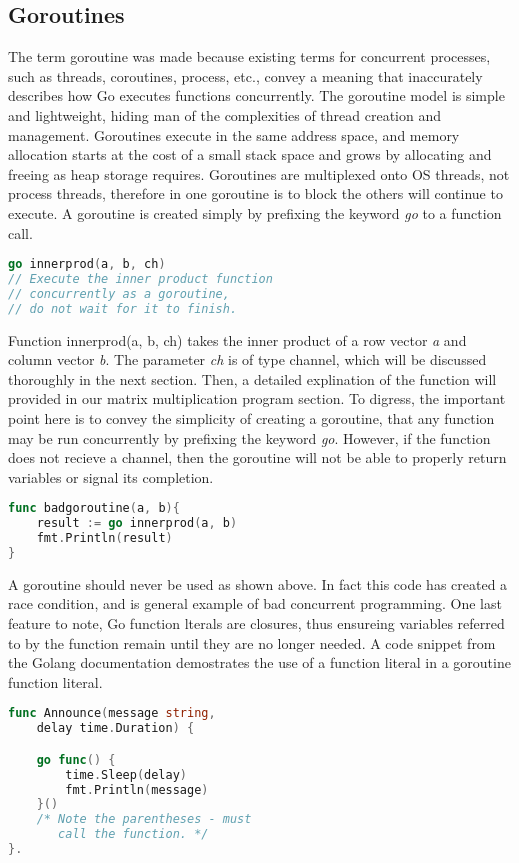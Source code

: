 \subsection{Goroutines}
	The term goroutine was made because existing terms for concurrent processes, such as threads, coroutines, process, etc., convey a meaning that inaccurately describes how Go executes functions concurrently. The goroutine model is simple and lightweight, hiding man of the complexities of thread creation and management. Goroutines execute in the same address space, and memory allocation starts at the cost of a small stack space and grows by allocating and freeing as heap storage requires. Goroutines are multiplexed onto OS threads, not process threads, therefore in one goroutine is to block the others will continue to execute.\cite{website:go-lang-documentation}
	A goroutine is created simply by prefixing the keyword \emph{go} to a function call.	
\begin{lstlisting}[language=Go]
go innerprod(a, b, ch) 
// Execute the inner product function
// concurrently as a goroutine,
// do not wait for it to finish.
\end{lstlisting}
Function innerprod(a, b, ch) takes the inner product of a row vector \emph{a} and column vector \emph{b}. The parameter \emph{ch} is of type channel, which will be discussed thoroughly in the next section. Then, a detailed explination of the function will provided in our matrix multiplication program section. To digress, the important point here is to convey the simplicity of creating a goroutine, that any function may be run concurrently by prefixing the keyword \emph{go}. However, if the function does not recieve a channel, then the goroutine will not be able to properly return variables or signal its completion.
\begin{lstlisting}[language=Go]
func badgoroutine(a, b){
	result := go innerprod(a, b)
	fmt.Println(result)
}
\end{lstlisting}
A goroutine should never be used as shown above. In fact this code has created a race condition, and is general example of bad concurrent programming.
	One last feature to note, Go function lterals are closures, thus ensureing variables referred to by the function remain until they are no longer needed. A code snippet from the Golang documentation demostrates the use of a function literal in a goroutine function literal.
\begin{lstlisting}[language=Go]
func Announce(message string, 
	delay time.Duration) {

    go func() {
        time.Sleep(delay)
        fmt.Println(message)
    }()  
    /* Note the parentheses - must
       call the function. */
}.
\end{lstlisting}
